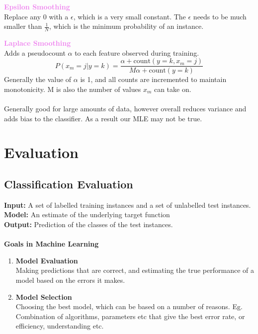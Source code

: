 \documentclass[a4paper,10pt]{article}
\begin{document}
\begin{shaded}
	\noindent \textcolor{Violet}{\textbf{Epsilon Smoothing}}\\
	Replace any 0 with a $\epsilon$, which is a very small constant. The $\epsilon$ needs to be much smaller than $\frac{1}{N}$, which is the minimum probability of an instance. 
\end{shaded}
\begin{shaded}
	\noindent \textcolor{Violet}{\textbf{Laplace Smoothing}}\\
	Adds a pseudocount $\alpha$ to each feature observed during training. 
	\begin{equation*}
		P(x_{m} = j | y = k) = \frac{\alpha + \text{count}(y=k, x_{m}=j)}{M\alpha + \text{count}(y=k)}
	\end{equation*}
	Generally the value of $\alpha$ is 1, and all counts are incremented to maintain monotonicity. M is also the number of values $x_{m}$ can take on. \\\\
	Generally good for large amounts of data, however overall reduces variance and adds bias to the classifier. As a result our MLE may not be true.
\end{shaded}
\newpage
\section*{Evaluation}
\subsection*{Classification Evaluation}
\textcolor{Periwinkle}{\textbf{Input:}} A set of labelled training instances and a set of unlabelled test instances. \\
\textcolor{Periwinkle}{\textbf{Model:}} An estimate of the underlying target function \\
\textcolor{Periwinkle}{\textbf{Output:}} Prediction of the classes of the test instances. \\\\
\textcolor{Periwinkle}{\textbf{Goals in Machine Learning}}
\begin{enumerate}
	\item \textbf{Model Evaluation} \\
	Making predictions that are correct, and estimating the true performance of a model based on the errors it makes. 
	\item \textbf{Model Selection} \\
	Choosing the best model, which can be based on a number of reasons. Eg. Combination of algorithms, parameters etc that give the best error rate, or efficiency, understanding etc. 
\end{enumerate}
\end{document}
